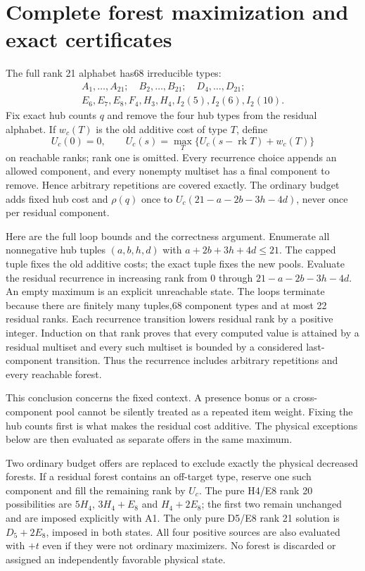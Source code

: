 \documentclass[11pt]{article}
\newcommand{\rk}{\operatorname{rk}}
\begin{document}
\section{Complete forest maximization and exact certificates}
The full rank 21 alphabet has68 irreducible types:
\[
\begin{gathered}
 A_1,\ldots,A_{21};\quad B_2,\ldots,B_{21};\quad D_4,\ldots,D_{21};\\
 E_6,E_7,E_8,F_4,H_3,H_4,I_2(5),I_2(6),I_2(10).
\end{gathered}
\]
Fix exact hub counts $q$ and remove the four hub types from the residual
alphabet. If $w_c(T)$ is the old additive cost of type $T$, define
\[
 U_c(0)=0,\qquad
 U_c(s)=\max_{T}\{U_c(s-\rk T)+w_c(T)\}
\]
on reachable ranks; rank one is omitted. Every recurrence choice appends
an allowed component, and every nonempty multiset has a final component
to remove. Hence arbitrary repetitions are covered exactly. The ordinary
budget adds fixed hub cost and $\rho(q)$ once to
$U_c(21-a-2b-3h-4d)$, never once per residual component.

Here are the full loop bounds and the correctness argument. Enumerate
all nonnegative hub tuples $(a,b,h,d)$ with
$a+2b+3h+4d\le21$. The capped tuple fixes the old additive costs;
the exact tuple fixes the new pools. Evaluate the residual recurrence
in increasing rank from 0 through $21-a-2b-3h-4d$. An empty maximum
is an explicit unreachable state. The loops terminate because there
are finitely many tuples,68 component types and at most 22 residual
ranks. Each recurrence transition lowers residual rank by a positive
integer. Induction on that rank proves that every computed value is
attained by a residual multiset and every such multiset is bounded
by a considered last-component transition. Thus the recurrence
includes arbitrary repetitions and every reachable forest.

This conclusion concerns the fixed context. A presence bonus or a
cross-component pool cannot be silently treated as a repeated item
weight. Fixing the hub counts first is what makes the residual
cost additive. The physical exceptions below are then evaluated as
separate offers in the same maximum.

Two ordinary budget offers are replaced to exclude exactly the physical
decreased forests. If a residual forest contains an off-target type,
reserve one such component and fill the remaining rank by $U_c$. The
pure H4/E8 rank 20 possibilities are $5H_4$, $3H_4+E_8$ and $H_4+2E_8$;
the first two remain unchanged and are imposed explicitly with A1.
The only pure D5/E8 rank 21 solution is $D_5+2E_8$, imposed in both
states. All four positive sources are also evaluated with $+t$ even if
they were not ordinary maximizers. No forest is discarded or assigned
an independently favorable physical state.
\end{document}
